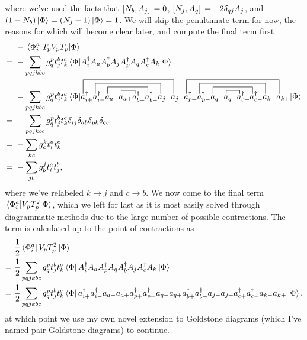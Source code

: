 \documentclass[10pt]{article}
\begin{document}
where we've used the facts that $\comm*{N_b}{A_j}=0$, $\comm*{N_j}{A_q}=-2\delta_{qj}A_j$, and $(1-N_b)\ket{\Phi}=(N_j-1)\ket{\Phi}=1$. We will skip the penultimate term for now, the reasons for which will become clear later, and compute the final term first
\begin{align}
& \ -\mel{\Phi^a_i}{T_pV_pT_p}{\Phi}
\\
=& \
-\sum_{pqjkbc}g^p_qt^b_jt^c_k\mel{\Phi}{A^\dagger_iA_aA^\dagger_bA_jA^\dagger_pA_qA^\dagger_cA_k}{\Phi}
\nonumber
\\
=& \
-\sum_{pqjkbc}g^p_qt^b_jt^c_k\mel{\Phi}{
\contraction[4ex]{}{a}{^\dagger_{i+}a^\dagger_{i-}a_{a-}a_{a+}a^\dagger_{b+}a^\dagger_{b-}a_{j-}}{a}
\contraction[3ex]{a^\dagger_{i+}}{a}{^\dagger_{i-}a_{a-}a_{a+}a^\dagger_{b+}a^\dagger_{b-}}{a}
\contraction[2ex]{a^\dagger_{i+}a^\dagger_{i-}}{a}{_{a-}a_{a+}a^\dagger_{b+}}{a}
\contraction[1ex]{a^\dagger_{i+}a^\dagger_{i-}a_{a-}}{a}{_{a+}}{a}
\contraction[4ex]{a^\dagger_{i+}a^\dagger_{i-}a_{a-}a_{a+}a^\dagger_{b+}a^\dagger_{b-}a_{j-}a_{j+}}{a}{^\dagger_{p+}a^\dagger_{p-}a_{q-}a_{q+}a^\dagger_{c+}a^\dagger_{c-}a_{k-}}{a}
\contraction[3ex]{a^\dagger_{i+}a^\dagger_{i-}a_{a-}a_{a+}a^\dagger_{b+}a^\dagger_{b-}a_{j-}a_{j+}a^\dagger_{p+}}{a}{^\dagger_{p-}a_{q-}a_{q+}a^\dagger_{c+}a^\dagger_{c-}}{a}
\contraction[2ex]{a^\dagger_{i+}a^\dagger_{i-}a_{a-}a_{a+}a^\dagger_{b+}a^\dagger_{b-}a_{j-}a_{j+}a^\dagger_{p+}a^\dagger_{p-}}{a}{_{q-}a_{q+}a^\dagger_{c+}}{a}
\contraction[1ex]{a^\dagger_{i+}a^\dagger_{i-}a_{a-}a_{a+}a^\dagger_{b+}a^\dagger_{b-}a_{j-}a_{j+}a^\dagger_{p+}a^\dagger_{p-}a_{q-}}{a}{_{q+}}{a}
a^\dagger_{i+}a^\dagger_{i-}a_{a-}a_{a+}a^\dagger_{b+}a^\dagger_{b-}a_{j-}a_{j+}a^\dagger_{p+}a^\dagger_{p-}a_{q-}a_{q+}a^\dagger_{c+}a^\dagger_{c-}a_{k-}a_{k+}
}{\Phi}
\nonumber
\\
=& \
-\sum_{pqjkbc}g^p_qt^b_jt^c_k\delta_{ij}\delta_{ab}\delta_{pk}\delta_{qc}
\nonumber
\\
=& \
-\sum_{kc}g^k_ct^a_it^c_k
\nonumber
\\
=& \
-\sum_{jb}g^j_bt^a_it^b_j
,\end{align}
where we've relabeled $k\to j$ and $c\to b$. We now come to the final term $\mel*{\Phi_i^a}{V_pT^2_p}{\Phi}$, which we left for last as it is most easily solved through diagrammatic methods due to the large number of possible contractions. The term is calculated up to the point of contractions as
\begin{align}
&\ \frac{1}{2}\bra*{\Phi_i^a}V_pT_p^2\ket{\Phi}
\nonumber
\\
=&\ 
\frac{1}{2}\sum_{pqjkbc}g^p_qt^b_jt^c_k\bra{\Phi}A^\dagger_iA_aA^\dagger_pA_qA^\dagger_bA_jA^\dagger_cA_k\ket{\Phi}
\nonumber
\\
\label{long_cont}
=&\ 
\frac{1}{2}\sum_{pqjkbc}g^p_qt^b_jt^c_k\bra{\Phi}
a^\dagger_{i+}a^\dagger_{i-}a_{a-}a_{a+}a^\dagger_{p+}a^\dagger_{p-}a_{q-}a_{q+}a^\dagger_{b+}a^\dagger_{b-}a_{j-}a_{j+}a^\dagger_{c+}a^\dagger_{c-}a_{k-}a_{k+}
\ket{\Phi}
,\end{align}
at which point we use my own novel extension to Goldstone diagrams (which I've named pair-Goldstone diagrams) to continue.
\end{document}
